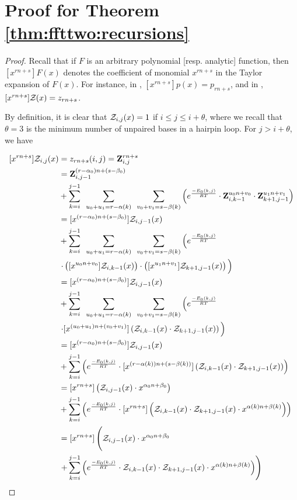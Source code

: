 \documentclass[11pt, oneside]{Thesis} %
\begin{document}
\section{Proof for Theorem \ref{thm:ffttwo:recursions}}
\label{sec:ffttwo:recursions}

\begin{proof}
Recall that if $F$ is an arbitrary
polynomial [resp. analytic] function, then $[x^{rn+s}]F(x)$
denotes the coefficient of monomial $x^{rn+s}$ in the
Taylor expansion of $F(x)$. For instance, in
, $[x^{rn+s}]p(x) = p_{rn+s}$, and in
, $[x^{rn+s}]{\mathcal Z}_{}(x) = z_{rn+s}$.

By definition, it is clear that ${\mathcal Z}_{i,j}(x)=1$ if $i \leq j \leq i + \theta$,
where we recall that $\theta = 3$ is the minimum number of unpaired bases in
a hairpin loop. For $j > i + \theta$, we have

\begin{align}
\begin{split}
[x^{rn+s}] \emZ{i,j} &= z_{rn+s}(i,j) = \bfZ{rn+s}{i,j} \\
&= \bfZ{(r-\alpha_0)n+(s-\beta_0)}{i,j-1} \\
&+
\sum_{k=i}^{j-1}\enspace
\sum_{u_0+u_1=r-\alpha(k)}\enspace
\sum_{v_0+v_1=s-\beta(k)}
\left( \boltzNuss{k,j}
\cdot \bfZ{u_0 n+v_0}{i,k-1} \cdot \bfZ{u_1 n+v_1}{k+1,j-1} \right) \\
&= [x^{(r-\alpha_0)n+(s-\beta_0)}] \emZ{i,j-1} \\
&+ \sum_{k=i}^{j-1}\enspace
\sum_{u_0+u_1=r-\alpha(k)}\enspace
\sum_{v_0+v_1=s-\beta(k)}
\left( \boltzNuss{k,j} \right. \\
&\left. \cdot \left( [x^{u_0 n+v_0}] \emZ{i,k-1} \right) \cdot
\left( [x^{u_1 n+v_1}] \emZ{k+1,j-1} \right)
\vphantom{\boltzNuss{k,j}} \right) \\
&= [x^{(r-\alpha_0)n+(s-\beta_0)}] \emZ{i,j-1} \\
&+ \sum_{k=i}^{j-1}\enspace
\sum_{u_0+u_1=r-\alpha(k)}\enspace
\sum_{v_0+v_1=s-\beta(k)}
\left( \boltzNuss{k,j} \right. \\
&\left. \cdot [x^{(u_0+u_1)n+(v_0+v_1)}] \left( \emZ{i,k-1} \cdot \emZ{k+1,j-1} \right)
\vphantom{\boltzNuss{k,j}} \right) \\
&= [x^{(r-\alpha_0)n+(s-\beta_0)}] \emZ{i,j-1} \\
&+ \sum_{k=i}^{j-1} \left( \boltzNuss{k,j}
\cdot [x^{(r-\alpha(k))n+(s-\beta(k))}] \left( \emZ{i,k-1} \cdot \emZ{k+1,j-1}
\right) \right) \\
&= [x^{rn+s}] \left( \emZ{i,j-1} \cdot x^{\ab{0}} \right) \\
&+ \sum_{k=i}^{j-1} \left( \boltzNuss{k,j}
\cdot [x^{rn+s}] \left( \emZ{i,k-1} \cdot \emZ{k+1,j-1} \cdot
x^{\alpha(k)n+\beta(k)} \right) \right) \\
&= [x^{rn+s}] \left( \vphantom{\sum_{k=i}^{j-1}} \emZ{i,j-1} \cdot x^{\ab{0}} \right. \\
&\left. + \sum_{k=i}^{j-1} \left( \boltzNuss{k,j}
\cdot \emZ{i,k-1} \cdot \emZ{k+1,j-1} \cdot
x^{\alpha(k)n+\beta(k)} \right) \right) \\
\end{split}
\end{align}
\end{proof}
\end{document}
